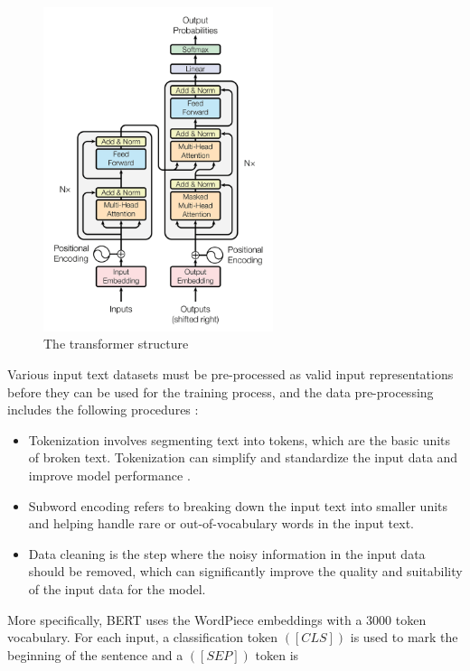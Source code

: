\documentclass[runningheads]{llncs}
\begin{document}
\begin{figure}[H]
  \centering
  \includegraphics[width=0.6\textwidth]{attention1.jpg}
  \caption{The transformer structure \cite{Vaswani17}}
  \label{fig:attention}
\end{figure}
\noindent \newline
Various input text datasets must be pre-processed as valid input representations before they can be used for the training process, and the data pre-processing includes the following procedures \cite{Roum23}:
\begin{itemize}
  \item Tokenization involves segmenting text into tokens, which are the basic units of broken text. Tokenization can simplify and standardize the input data and improve model performance \cite{Devlin18}.
  \item Subword encoding refers to breaking down the input text into smaller units and helping handle rare or out-of-vocabulary words in the input text.
  \item Data cleaning is the step where the noisy information in the input data should be removed, which can significantly improve the quality and suitability of the input data for the model.
\end{itemize} 
\noindent \newline
More specifically, BERT uses the WordPiece embeddings \cite{Wu16} with a 3000 token vocabulary. For each input, a classification token $([CLS])$ is used to mark the beginning of the sentence and a $([SEP])$ token is
\end{document}
